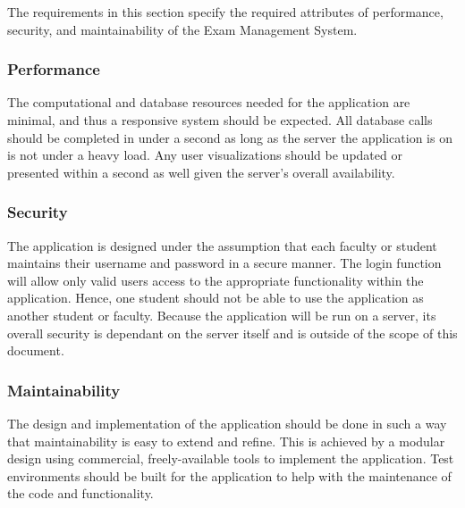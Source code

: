 
The requirements in this section specify the required attributes of performance,
security, and maintainability of the Exam Management System.

\subsubsection{Performance}

The computational and database resources needed for the application are minimal,
and thus a responsive system should be expected. All database calls should be
completed in under a second as long as the server the application is on is not
under a heavy load. Any user visualizations should be updated or presented
within a second as well given the server's overall availability.

\subsubsection{Security}

The application is designed under the assumption that each faculty or student
maintains their username and password in a secure manner. The login function
will allow only valid users access to the appropriate functionality within the
application. Hence, one student should not be able to use the application as
another student or faculty. Because the application will be run on a server,
its overall security is dependant on the server itself and is outside of the
scope of this document.

\subsubsection{Maintainability}

The design and implementation of the application should be done in such a way
that maintainability is easy to extend and refine. This is achieved by a
modular design using commercial, freely-available tools to implement the
application. Test environments should be built for the application to help with
the maintenance of the code and functionality.
